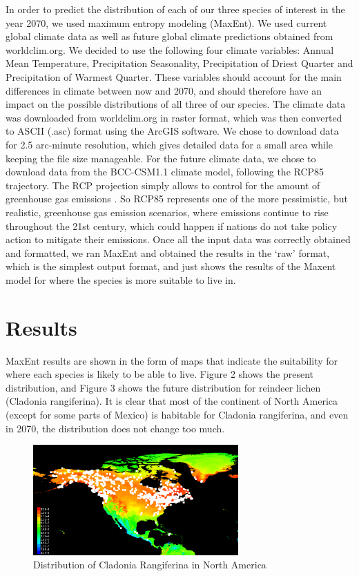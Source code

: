 \documentclass[twoside]{article}
\begin{document}
\indent In order to predict the distribution of each of our three species of interest
in the year 2070, we used maximum entropy modeling (MaxEnt). We used current
global climate data as well as future global climate predictions obtained
from worldclim.org. We decided to use the following four climate variables:
Annual Mean Temperature, Precipitation Seasonality, Precipitation of Driest
Quarter and Precipitation of Warmest Quarter. These variables should account
for the main differences in climate between now and 2070, and should therefore
have an impact on the possible distributions of all three of our species.
The climate data was downloaded from worldclim.org in raster format, which was
then converted to ASCII (.asc) format using the ArcGIS software. We chose to
download data for 2.5 arc-minute resolution, which gives detailed data for a
small area while keeping the file size manageable. For the future climate data,
we chose to download data from the BCC-CSM1.1 climate model, following the
RCP85 trajectory. The RCP projection simply allows to control for the amount
of greenhouse gas emissions \cite{ipcc}. So RCP85 represents one of the more
pessimistic, but realistic, greenhouse gas emission scenarios, where emissions
continue to rise throughout the 21st century, which could happen if nations
do not take policy action to mitigate their emissions. Once all the input data
was correctly obtained and formatted, we ran MaxEnt and obtained the results
in the ‘raw’ format, which is the simplest output format, and just shows the
results of the Maxent model for where the species is more suitable to live in.


\section{Results}
\indent MaxEnt results are shown in the form of maps that indicate the suitability
for where each species is likely to be able to live. Figure 2 shows the
present distribution, and Figure 3 shows the future distribution for
reindeer lichen (Cladonia rangiferina). It is clear that most of the
continent of North America (except for some parts of Mexico) is habitable
for Cladonia rangiferina, and even in 2070, the distribution does not change
too much. \\
\begin{figure}[H]
\centering
\includegraphics[width=0.7\textwidth]{NCladoniaPresent}
\caption{Distribution of Cladonia Rangiferina in North America}
\end{figure}
\end{document}
